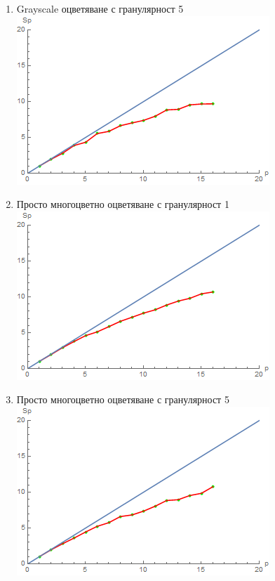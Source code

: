 \begin{Large}
\begin{enumerate}
\item Grayscale оцветяване с гранулярност 5
\newline
\includegraphics[scale=1]{tt2}
\item Просто многоцветно оцветяване с гранулярност 1
\newline
\includegraphics[scale=1]{tt3}
\item Просто многоцветно оцветяване с гранулярност 5
\newline
\includegraphics[scale=1]{tt4}
\end{enumerate}

\end{Large}
